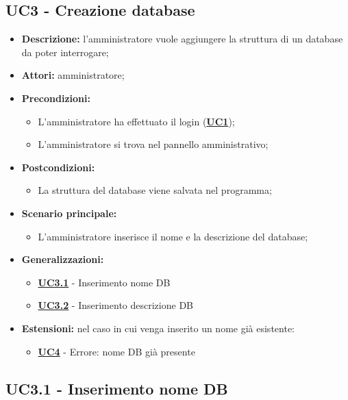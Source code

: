 \documentclass[5pt]{article}
\begin{document}
\subsection{UC3 - Creazione database}
\label{sec:UC3}
\begin{itemize}
	\item \textbf{Descrizione:} l’amministratore vuole aggiungere la struttura di un database da poter interrogare;
	\item \textbf{Attori:} amministratore;
	\item \textbf{Precondizioni:} 
	\begin{itemize}
		\item L’amministratore ha effettuato il login (\hyperref[sec:UC1]{\textbf{UC1}});
		\item L’amministratore si trova nel pannello amministrativo;
	\end{itemize}
	\item \textbf{Postcondizioni:} 
	\begin{itemize}
		\item La struttura del database viene salvata nel programma;
	\end{itemize}
	\item \textbf{Scenario principale:} 
	\begin{itemize}
		\item L’amministratore inserisce il nome e la descrizione del database;
	\end{itemize}
	\item \textbf{Generalizzazioni:} 
	\begin{itemize}
		\item \hyperref[sec:UC3.1]{\textbf{UC3.1}} - Inserimento nome DB
		\item \hyperref[sec:UC3.2]{\textbf{UC3.2}} - Inserimento descrizione DB
	\end{itemize}
	\item \textbf{Estensioni:} nel caso in cui venga inserito un nome già esistente:
	\begin{itemize}
		\item \hyperref[sec:UC4]{\textbf{UC4}} - Errore: nome DB già presente
	\end{itemize}
\end{itemize}

\subsection{UC3.1 - Inserimento nome DB}
\label{sec:UC3.1}
\end{document}
